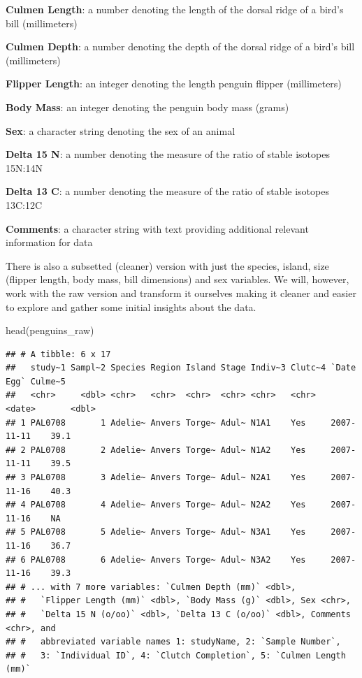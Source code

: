 \documentclass[
]{book}
\newenvironment{Shaded}{\begin{snugshade}}{\end{snugshade}}
\newcommand{\FunctionTok}[1]{\textcolor[rgb]{0.00,0.00,0.00}{#1}}
\newcommand{\NormalTok}[1]{#1}
\begin{document}
\textbf{Culmen Length}: a number denoting the length of the dorsal ridge of a bird's bill (millimeters)

\textbf{Culmen Depth}: a number denoting the depth of the dorsal ridge of a bird's bill (millimeters)

\textbf{Flipper Length}: an integer denoting the length penguin flipper (millimeters)

\textbf{Body Mass}: an integer denoting the penguin body mass (grams)

\textbf{Sex}: a character string denoting the sex of an animal

\textbf{Delta 15 N}: a number denoting the measure of the ratio of stable isotopes 15N:14N

\textbf{Delta 13 C}: a number denoting the measure of the ratio of stable isotopes 13C:12C

\textbf{Comments}: a character string with text providing additional relevant information for data

There is also a subsetted (cleaner) version with just the species, island, size (flipper length, body mass, bill dimensions) and sex variables.
We will, however, work with the raw version and transform it ourselves making it cleaner and easier to explore and gather some initial insights about the data.

\begin{Shaded}
\begin{Highlighting}[]
\FunctionTok{head}\NormalTok{(penguins\_raw)}
\end{Highlighting}
\end{Shaded}

\begin{verbatim}
## # A tibble: 6 x 17
##   study~1 Sampl~2 Species Region Island Stage Indiv~3 Clutc~4 `Date Egg` Culme~5
##   <chr>     <dbl> <chr>   <chr>  <chr>  <chr> <chr>   <chr>   <date>       <dbl>
## 1 PAL0708       1 Adelie~ Anvers Torge~ Adul~ N1A1    Yes     2007-11-11    39.1
## 2 PAL0708       2 Adelie~ Anvers Torge~ Adul~ N1A2    Yes     2007-11-11    39.5
## 3 PAL0708       3 Adelie~ Anvers Torge~ Adul~ N2A1    Yes     2007-11-16    40.3
## 4 PAL0708       4 Adelie~ Anvers Torge~ Adul~ N2A2    Yes     2007-11-16    NA  
## 5 PAL0708       5 Adelie~ Anvers Torge~ Adul~ N3A1    Yes     2007-11-16    36.7
## 6 PAL0708       6 Adelie~ Anvers Torge~ Adul~ N3A2    Yes     2007-11-16    39.3
## # ... with 7 more variables: `Culmen Depth (mm)` <dbl>,
## #   `Flipper Length (mm)` <dbl>, `Body Mass (g)` <dbl>, Sex <chr>,
## #   `Delta 15 N (o/oo)` <dbl>, `Delta 13 C (o/oo)` <dbl>, Comments <chr>, and
## #   abbreviated variable names 1: studyName, 2: `Sample Number`,
## #   3: `Individual ID`, 4: `Clutch Completion`, 5: `Culmen Length (mm)`
\end{verbatim}
\end{document}
